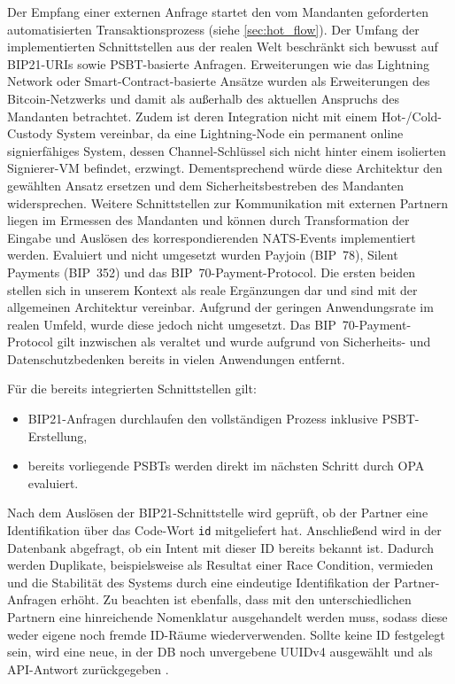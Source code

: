 Der Empfang einer externen Anfrage startet den vom Mandanten geforderten automatisierten Transaktionsprozess (siehe \ref{sec:hot_flow}). Der Umfang der implementierten Schnittstellen aus der realen Welt beschränkt sich bewusst auf \ac{BIP}21-\acp{URI} sowie \ac{PSBT}-basierte Anfragen. Erweiterungen wie das Lightning Network oder Smart-Contract-basierte Ansätze wurden als Erweiterungen des Bitcoin-Netzwerks und damit als außerhalb des aktuellen Anspruchs des Mandanten betrachtet. Zudem ist deren Integration nicht mit einem Hot-/Cold-Custody System vereinbar, da eine Lightning-Node ein permanent online signierfähiges System, dessen Channel-Schlüssel sich nicht hinter einem isolierten Signierer-\ac{VM} befindet, erzwingt. Dementsprechend würde diese Architektur den gewählten Ansatz ersetzen und dem Sicherheitsbestreben des Mandanten widersprechen.
Weitere Schnittstellen zur Kommunikation mit externen Partnern liegen im Ermessen des Mandanten und können durch Transformation der Eingabe und Auslösen des korrespondierenden \ac{NATS}-Events implementiert werden. Evaluiert und nicht umgesetzt wurden Payjoin (\ac{BIP}~78), Silent Payments (\ac{BIP}~352) und das \ac{BIP}~70-Payment-Protocol. Die ersten beiden stellen sich in unserem Kontext als reale Ergänzungen dar und sind mit der allgemeinen Architektur vereinbar. Aufgrund der geringen Anwendungsrate im realen Umfeld, wurde diese jedoch nicht umgesetzt. Das \ac{BIP}~70-Payment-Protocol gilt inzwischen als veraltet und wurde aufgrund von Sicherheits- und Datenschutzbedenken bereits in vielen Anwendungen entfernt.

Für die bereits integrierten Schnittstellen gilt:
\begin{itemize}
    \item \ac{BIP}21-Anfragen durchlaufen den vollständigen Prozess inklusive \ac{PSBT}-Erstellung,
    \item bereits vorliegende \acp{PSBT} werden direkt im nächsten Schritt durch \ac{OPA} evaluiert.
\end{itemize}

Nach dem Auslösen der \ac{BIP}21-Schnittstelle wird geprüft, ob der Partner eine Identifikation über das Code-Wort \texttt{id} mitgeliefert hat. Anschließend wird in der Datenbank abgefragt, ob ein Intent mit dieser \ac{ID} bereits bekannt ist. Dadurch werden Duplikate, beispielsweise als Resultat einer Race Condition, vermieden und die Stabilität des Systems durch eine eindeutige Identifikation der Partner-Anfragen erhöht. Zu beachten ist ebenfalls, dass mit den unterschiedlichen Partnern eine hinreichende Nomenklatur ausgehandelt werden muss, sodass diese weder eigene noch fremde \ac{ID}-Räume wiederverwenden. Sollte keine \ac{ID} festgelegt sein, wird eine neue, in der \ac{DB} noch unvergebene UUIDv4 ausgewählt und als \ac{API}-Antwort zurückgegeben \cite{bip21}.


